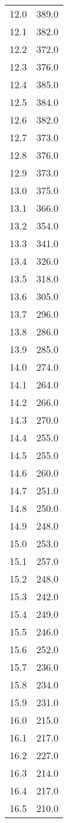 \begin{table}
\begin{minipage}{0.5\textwidth}
\begin{tabular}{c c}
12.0		&389.0\\
12.1		&382.0\\
12.2		&372.0\\
12.3		&376.0\\
12.4		&385.0\\
12.5		&384.0\\
12.6		&382.0\\
12.7		&373.0\\
12.8		&376.0\\
12.9		&373.0\\
13.0		&375.0\\
13.1		&366.0\\
13.2		&354.0\\
13.3		&341.0\\
13.4		&326.0\\
13.5		&318.0\\
13.6		&305.0\\
13.7		&296.0\\
13.8		&286.0\\
13.9		&285.0\\
14.0		&274.0\\
14.1		&264.0\\
14.2		&266.0\\
14.3		&270.0\\
14.4		&255.0\\
14.5		&255.0\\
14.6		&260.0\\
14.7		&251.0\\
14.8		&250.0\\
14.9		&248.0\\
15.0		&253.0\\
15.1		&257.0\\
15.2		&248.0\\
15.3		&242.0\\
15.4		&249.0\\
15.5		&246.0\\
15.6		&252.0\\
15.7		&236.0\\
15.8		&234.0\\
15.9		&231.0\\
16.0		&215.0\\
16.1		&217.0\\
16.2		&227.0\\
16.3		&214.0\\
16.4		&217.0\\
16.5		&210.0\\
    \bottomrule
\end{tabular}

\end{minipage}
\end{table}
